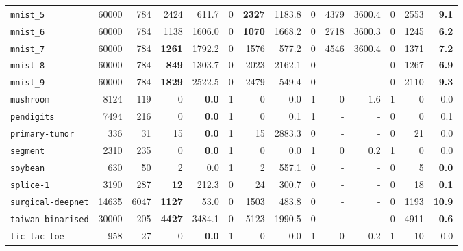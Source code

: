 \begin{tabular}{lccrrrrrrrrrrr}
\texttt{mnist\_5} & \multicolumn{1}{r}{60000} & \multicolumn{1}{r}{784}  & 2424 & 611.7 & 0 & \textbf{2327} & 1183.8 & 0 & 4379 & 3600.4 & 0 & 2553 & \textbf{9.1}\\
\texttt{mnist\_6} & \multicolumn{1}{r}{60000} & \multicolumn{1}{r}{784}  & 1138 & 1606.0 & 0 & \textbf{1070} & 1668.2 & 0 & 2718 & 3600.3 & 0 & 1245 & \textbf{6.2}\\
\texttt{mnist\_7} & \multicolumn{1}{r}{60000} & \multicolumn{1}{r}{784}  & \textbf{1261} & 1792.2 & 0 & 1576 & 577.2 & 0 & 4546 & 3600.4 & 0 & 1371 & \textbf{7.2}\\
\texttt{mnist\_8} & \multicolumn{1}{r}{60000} & \multicolumn{1}{r}{784}  & \textbf{849} & 1303.7 & 0 & 2023 & 2162.1 & 0 & - & - & 0 & 1267 & \textbf{6.9}\\
\texttt{mnist\_9} & \multicolumn{1}{r}{60000} & \multicolumn{1}{r}{784}  & \textbf{1829} & 2522.5 & 0 & 2479 & 549.4 & 0 & - & - & 0 & 2110 & \textbf{9.3}\\
\texttt{mushroom} & \multicolumn{1}{r}{8124} & \multicolumn{1}{r}{119}  & 0 & \textbf{0.0} & 1 & 0 & 0.0 & 1 & 0 & 1.6 & 1 & 0 & 0.0\\
\texttt{pendigits} & \multicolumn{1}{r}{7494} & \multicolumn{1}{r}{216}  & 0 & \textbf{0.0} & 1 & 0 & 0.1 & 1 & - & - & 0 & 0 & 0.1\\
\texttt{primary-tumor} & \multicolumn{1}{r}{336} & \multicolumn{1}{r}{31}  & 15 & \textbf{0.0} & 1 & 15 & 2883.3 & 0 & - & - & 0 & 21 & 0.0\\
\texttt{segment} & \multicolumn{1}{r}{2310} & \multicolumn{1}{r}{235}  & 0 & \textbf{0.0} & 1 & 0 & 0.0 & 1 & 0 & 0.2 & 1 & 0 & 0.0\\
\texttt{soybean} & \multicolumn{1}{r}{630} & \multicolumn{1}{r}{50}  & 2 & 0.0 & 1 & 2 & 557.1 & 0 & - & - & 0 & 5 & \textbf{0.0}\\
\texttt{splice-1} & \multicolumn{1}{r}{3190} & \multicolumn{1}{r}{287}  & \textbf{12} & 212.3 & 0 & 24 & 300.7 & 0 & - & - & 0 & 18 & \textbf{0.1}\\
\texttt{surgical-deepnet} & \multicolumn{1}{r}{14635} & \multicolumn{1}{r}{6047}  & \textbf{1127} & 53.0 & 0 & 1503 & 483.8 & 0 & - & - & 0 & 1193 & \textbf{10.9}\\
\texttt{taiwan\_binarised} & \multicolumn{1}{r}{30000} & \multicolumn{1}{r}{205}  & \textbf{4427} & 3484.1 & 0 & 5123 & 1990.5 & 0 & - & - & 0 & 4911 & \textbf{0.6}\\
\texttt{tic-tac-toe} & \multicolumn{1}{r}{958} & \multicolumn{1}{r}{27}  & 0 & \textbf{0.0} & 1 & 0 & 0.0 & 1 & 0 & 0.2 & 1 & 10 & 0.0\\

\end{tabular}
